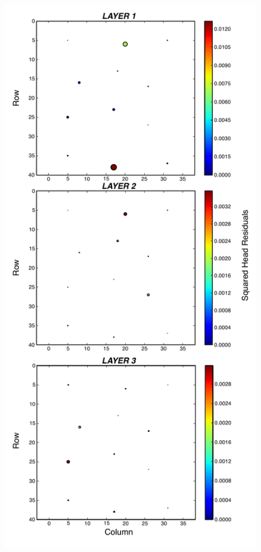 \documentclass[11pt,oneside,onecolumn]{usgsreport}
\begin{document}
\begin{appendix}
\begin{figure}[H]
\begin{center}\includegraphics[scale=0.5]{figures/3L_resid_case1}\end{center}


\end{figure}
\end{appendix}
\end{document}
